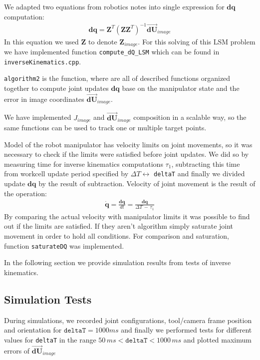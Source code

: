 \documentclass[]{scrartcl}
\begin{document}
We adapted two equations from robotics notes into single expression for ${\boldsymbol{dq}}$ computation:
\begin{align}
	\boldsymbol{dq} = \boldsymbol{Z}^T\left(\boldsymbol{Z}\boldsymbol{Z}^T\right)^{-1} \overrightarrow{\boldsymbol{dU}}_{image}
\end{align}
In this equation we used $\boldsymbol{Z}$ to denote $\boldsymbol{Z}_{image}$.
For this solving of this LSM problem we have implemented function \texttt{compute\_dQ\_LSM} which can be found in \texttt{inverseKinematics.cpp}.

\texttt{algorithm2} is the function, where are all of described functions organized together to compute joint updates $\boldsymbol{dq}$ base on the manipulator state and the error in image coordinates $\overrightarrow{\boldsymbol{dU}}_{image}$.

We have implemented $J_{image}$ and $\overrightarrow{\boldsymbol{dU}}_{image}$ composition in a scalable way, so the same functions can be used to track one or multiple target points.

Model of the robot manipulator has velocity limits on joint movements, so it was necessary to check if the limits were satisfied before joint updates. We did so by measuring time for inverse kinematics computations $\tau_1$, subtracting this time from workcell update period specified by $\Delta T \longleftrightarrow$ \texttt{deltaT} and finally we divided update $\boldsymbol{dq}$ by the result of subtraction. Velocity of joint movement is the result of the operation:
\begin{align}
	\boldsymbol{\dot{q}} = \frac{\boldsymbol{dq}}{dt} = \frac{\boldsymbol{dq}}{\Delta T\, -\, \tau_1}
\end{align}
By comparing the actual velocity with manipulator limits it was possible to find out if the limits are satisfied. If they aren't algorithm simply saturate joint movement in order to hold all conditions. For comparison and saturation, function \texttt{saturateDQ} was implemented.

In the following section we provide simulation results from tests of inverse kinematics.

\subsection{Simulation Tests}
During simulations, we recorded joint configurations, tool/camera frame position and orientation for $\texttt{deltaT} = 1000 ms$ and finally we performed tests for different values for \texttt{deltaT} in the range $50\, ms < \texttt{deltaT} < 1000\, ms$ and plotted maximum errors of 
$\overrightarrow{\boldsymbol{dU}}_{image}$
\end{document}
